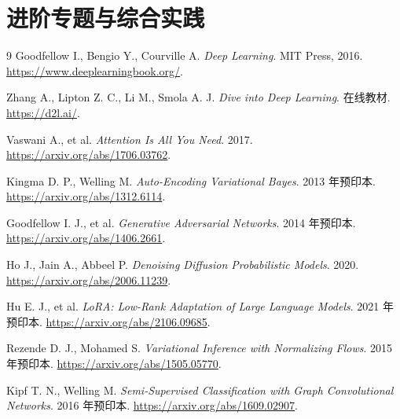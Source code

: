 \documentclass[UTF8,12pt,a4paper,fontset=fandol]{ctexbook}
\begin{document}
\part{进阶专题与综合实践}





\begin{thebibliography}{9}
Goodfellow I., Bengio Y., Courville A. \textit{Deep Learning}. MIT Press, 2016. \url{https://www.deeplearningbook.org/}.

Zhang A., Lipton Z. C., Li M., Smola A. J. \textit{Dive into Deep Learning}. 在线教材. \url{https://d2l.ai/}.

Vaswani A., et al. \textit{Attention Is All You Need}. 2017. \url{https://arxiv.org/abs/1706.03762}.

Kingma D. P., Welling M. \textit{Auto-Encoding Variational Bayes}. 2013 年预印本. \url{https://arxiv.org/abs/1312.6114}.

Goodfellow I. J., et al. \textit{Generative Adversarial Networks}. 2014 年预印本. \url{https://arxiv.org/abs/1406.2661}.

Ho J., Jain A., Abbeel P. \textit{Denoising Diffusion Probabilistic Models}. 2020. \url{https://arxiv.org/abs/2006.11239}.

Hu E. J., et al. \textit{LoRA: Low-Rank Adaptation of Large Language Models}. 2021 年预印本. \url{https://arxiv.org/abs/2106.09685}.

Rezende D. J., Mohamed S. \textit{Variational Inference with Normalizing Flows}. 2015 年预印本. \url{https://arxiv.org/abs/1505.05770}.

Kipf T. N., Welling M. \textit{Semi-Supervised Classification with Graph Convolutional Networks}. 2016 年预印本. \url{https://arxiv.org/abs/1609.02907}.
\end{thebibliography}
\end{document}
